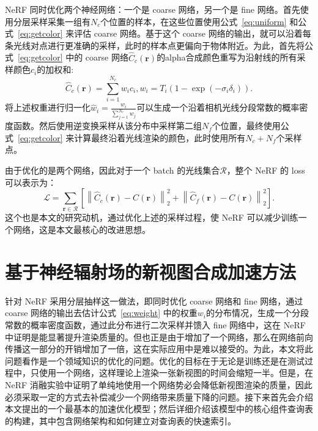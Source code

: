 NeRF 同时优化两个神经网络：一个是 coarse 网络，另一个是 fine 网络。首先使用分层采样采集一组有$N_c$个位置的样本，在这些位置使用公式~\ref{eq:uniform} 和公式~\ref{eq:getcolor} 来评估 coarse 网络。基于这个 coarse 网络的输出，就可以沿着每条光线对点进行更准确的采样，此时的样本点更偏向于物体附近。为此，首先将公式~\ref{eq:getcolor} 中的 coarse 网络$\displaystyle \hat{C}_{c} \left(\symbf{r}\right)$的alpha合成颜色重写为沿射线的所有采样颜色$\displaystyle c_i$的加权和:
\begin{equation}
    \hat{C}_{c}\left(\symbf{r}\right) = \sum_{i=1}^{N_c}w_{i}c_{i}, w_{i} = T_{i}\left(1 - \exp \left(-\sigma_{i}\delta_{i}\right)\right).
    \label{eq:weight}
\end{equation}
将上述权重进行归一化$\displaystyle \hat{w}_{i} = \frac{w_i}{\sum_{j=1}^{N_c}w_j}$可以生成一个沿着相机光线分段常数的概率密度函数。然后使用逆变换采样从该分布中采样第二组$\displaystyle N_f$个位置，最终使用公式~\ref{eq:getcolor} 来计算最终沿着光线渲染的颜色，此时使用所有$\displaystyle N_c + N_f$个采样点。

由于优化的是两个网络，因此对于一个 batch 的光线集合$\mathcal{R}$，整个 NeRF 的 loss 可以表示为：
\begin{equation}
    \mathcal{L} = \sum_{\symbf{r}\in \mathcal{R}}\left[\left\|\hat{C}_{c}\left(\symbf{r}\right) - C\left(\symbf{r}\right)\right\|_{2}^{2} + \left\|\hat{C}_{f}\left(\symbf{r}\right) - C\left(\symbf{r}\right)\right\|_{2}^{2} \right].
    \label{eq:nerf_loss}
\end{equation}
这个也是本文的研究动机，通过优化上述的采样过程，使 NeRF 可以减少训练一个网络，这是本文最核心的改进思想。

\section{基于神经辐射场的新视图合成加速方法}\label{method}
针对 NeRF 采用分层抽样这一做法，即同时优化 coarse 网络和 fine 网络，通过 coarse 网络的输出去估计公式~\ref{eq:weight} 中的权重$\displaystyle w_i$的分布情况，生成一个分段常数的概率密度函数，通过此分布进行二次采样并馈入 fine 网络中，这在 NeRF 中证明是能显著提升渲染质量的。但也正是由于增加了一个网络，那么在网络前向传播这一部分的开销增加了一倍，这在实际应用中是难以接受的。为此，本文将此问题看作是一个领域知识的优化的问题。优化的目标在于无论是训练还是在测试过程中，只使用一个网络，这样理论上渲染一张新视图的时间会缩短一半。但是，在 NeRF 消融实验中证明了单纯地使用一个网络势必会降低新视图渲染的质量，因此必须采取一定的方式去补偿减少一个网络带来质量下降的问题。接下来首先会介绍本文提出的一个最基本的加速优化模型；然后详细介绍该模型中的核心组件查询表的构建，其中包含网络架构和如何建立对查询表的快速索引。

